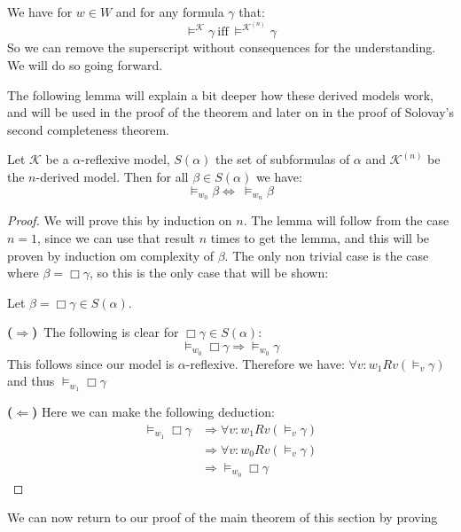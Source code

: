 \documentclass[../main.tex]{subfiles}
\begin{document}
\begin{remark}
	We have for $w\in W$ and for any formula $\gamma$ that:
	\[\vDash^{\mathcal{K}}\gamma\ \text{iff}\
	\vDash^{\mathcal{K}^{(n)}}\gamma\]
	So we can remove the superscript without consequences for the
	understanding. We will do so going forward.
\end{remark}

The following lemma will explain a bit deeper how these derived models work,
and will be used in the proof of the theorem and later on in the proof of Solovay's
second completeness theorem.

\begin{lem}
	\label{lem:GLS}
	Let $\mathcal{K}$ be a $\alpha$-reflexive model, $S(\alpha)$ the set of
	subformulas of $\alpha$ and $\mathcal{K}^{(n)}$ be the $n$-derived
	model. Then for all $\beta\in S(\alpha)$ we have:
	$$\vDash_{w_0}\beta\Leftrightarrow\ \vDash_{w_n}\beta$$
\end{lem}
\begin{proof}
	We will prove this by induction on $n$. The lemma will follow from the
	case $n=1$, since we can use that result $n$ times to get the lemma, and this will be proven by induction om complexity
	of $\beta$. The only non trivial case is the case where
	$\beta=\Box\gamma$, so this is the only case that will be shown:

	Let $\beta=\Box\gamma\in S(\alpha)$. 

	\textbf{($\Rightarrow$)}\ The following is clear for
	$\Box\gamma\in S(\alpha)$:
	\[\vDash_{w_0}\Box\gamma\Rightarrow\vDash_{w_0}\gamma\]
	This follows since our model is $\alpha$-reflexive. Therefore we have:
	$\forall v:w_1Rv(\vDash_{v}\gamma)$ and thus $\vDash_{w_1}\Box\gamma$

	\textbf{($\Leftarrow$)} Here we can make the following deduction:
	\begin{align*}
		\vDash_{w_1}\Box\gamma&\Rightarrow\forall
		v:w_1Rv(\vDash_v\gamma)\\
				      &\Rightarrow\forall
				      v:w_0Rv(\vDash_v\gamma)\\
				      &\Rightarrow\vDash_{w_0}\Box\gamma
	\end{align*}
\end{proof}
We can now return to our proof of the main theorem of this section by proving
\end{document}
